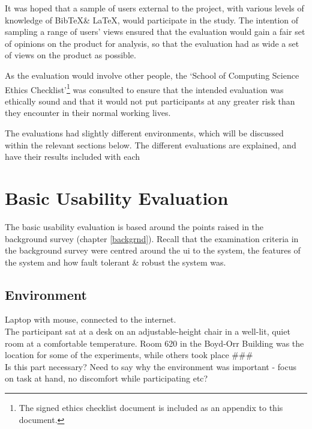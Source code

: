 \documentclass{l4proj}
\newcommand{\BibTeX}{B{\sc ib}\TeX}
\newcommand{\bibtex}{\BibTeX}
\newcommand{\revisit}{\#\#\#}
\begin{document}
It was hoped that a sample of users external to the project, with various levels of knowledge of \bibtex \& \LaTeX, would participate in the study. The intention of sampling a range of users' views ensured that the evaluation would gain a fair set of opinions on the product for analysis, so that the evaluation had as wide a set of views on the product as possible. 

As the evaluation would involve other people, the `School of Computing Science Ethics Checklist'\footnote{The signed ethics checklist document is included as an appendix to this document.} was consulted to ensure that the intended evaluation was ethically sound and that it would not put participants at any greater risk than they encounter in their normal working lives.

The evaluations had slightly different environments, which will be discussed within the relevant sections below.  The different evaluations are explained, and have their results included with each 

\section{Basic Usability Evaluation}
The basic usability evaluation is based around the points raised in the background survey (chapter \ref{backgrnd}).  Recall that the examination criteria in the background survey were centred around the \gls{ui} to the system, the features of the system and how fault tolerant \& robust the system was.

\subsection{Environment}
Laptop with mouse, connected to the internet.\\
The participant sat at a desk on an adjustable-height chair in a well-lit, quiet room at a comfortable temperature.	Room 620 in the Boyd-Orr Building was the location for some of the experiments, while others took place \revisit \\
Is this part necessary? Need to say why the environment was important - focus on task at hand, no discomfort while participating etc?
\end{document}
